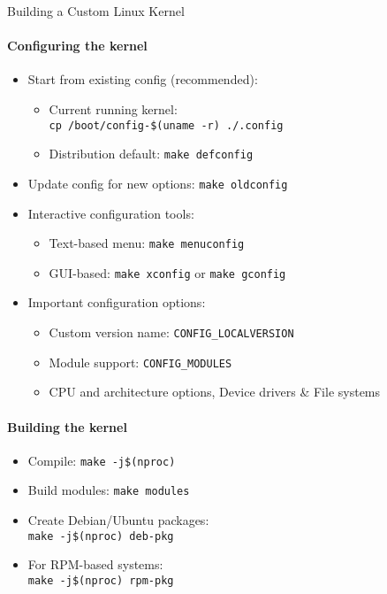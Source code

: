 \begin{KR}{Building a Custom Linux Kernel}
\begin{minipage}{0.5\linewidth}
    \paragraph{Configuring the kernel}
    \begin{itemize}
        \item Start from existing config (recommended):
            \begin{itemize}
                \item Current running kernel: \\ \texttt{cp /boot/config-\$(uname -r) ./.config}
                \item Distribution default: \texttt{make defconfig}
            \end{itemize}
        \item Update config for new options: \texttt{make oldconfig}
        \item Interactive configuration tools:
            \begin{itemize}
                \item Text-based menu: \texttt{make menuconfig}
                \item GUI-based: \texttt{make xconfig} or \texttt{make gconfig}
            \end{itemize}
        \item Important configuration options:
            \begin{itemize}
                \item Custom version name: \texttt{CONFIG\_LOCALVERSION}
                \item Module support: \texttt{CONFIG\_MODULES}
                \item CPU and architecture options, Device drivers \& File systems
            \end{itemize}
    \end{itemize}
    \end{minipage}
    \begin{minipage}{0.5\linewidth}
    \paragraph{Building the kernel}
    \begin{itemize}
        \item Compile: \texttt{make -j\$(nproc)}
        \item Build modules: \texttt{make modules}
        \item Create Debian/Ubuntu packages: \\ \texttt{make -j\$(nproc) deb-pkg}
        \item For RPM-based systems: \\ \texttt{make -j\$(nproc) rpm-pkg}
    \end{itemize}
    

\end{minipage}
\end{KR}
